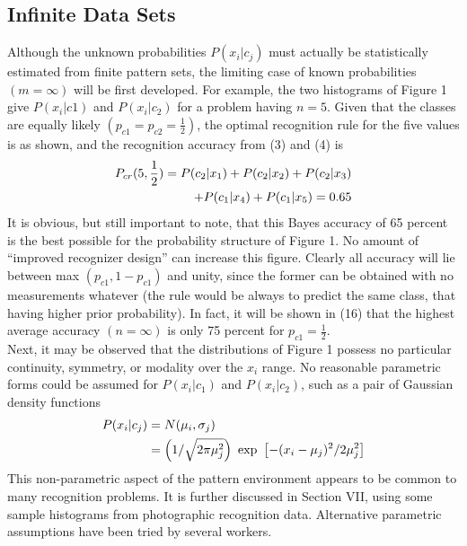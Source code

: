 \documentclass[10pt, a4paper]{article}
\begin{document}
\begin{CJK*}{UTF8}{bsmi}
\begin{multicols}{2}
\section{Infinite Data Sets}
\hspace{1em} Although the unknown probabilities $P(x_i | c_j)$ must actually be statistically estimated from finite pattern sets, the limiting case of known probabilities $(m = \infty)$ will be first developed. 
For example, the two histograms of Figure 1 give $P(x_i | c1)$ and $P(x_i | c_2)$ for a problem having $n = 5$. 
Given that the classes are equally likely $(p_{c1} = p_{c2} = \frac{1}{2})$, the optimal recognition rule for the five values is as shown, and the recognition accuracy from (3) and (4) is
\begin{align}
    P_{cr}(5, \frac{1}{2})=P(c_2|x_1)+P(c_2|x_2)+P(c_2|x_3) \notag \\
    +P(c_1|x_4)+P(c_1|x_5)=0.65
\end{align}
\hspace{1em} It is obvious, but still important to note, that this Bayes accuracy of 65 percent is the best possible for the probability structure of Figure 1. 
No amount of “improved recognizer design” can increase this figure. 
Clearly all accuracy will lie between max $(p_{c1}, 1 -p_{c1})$ and unity, since the former can be obtained with no measurements whatever (the rule would be always to predict the same class, that having higher prior probability). 
In fact, it will be shown in (16) that the highest average accuracy $(n = \infty)$ is only 75 percent for $p_{c1} = \frac{1}{2}$. \\
\hspace{1em} Next, it may be observed that the distributions of Figure 1 possess no particular continuity, symmetry, or modality over the $x_i$ range. 
No reasonable parametric forms could be assumed for $P(x_i|c_1)$ and $P(x_i|c_2)$, such as a pair of Gaussian density functions
\begin{align}
    P(x_i|c_j) &= N(\mu_i, \sigma_j) \notag \\
    &= \left(1/\sqrt{2\pi\mu^2_j}\right)\ \exp\ \left[-(x_i-\mu_j)^2/2\mu^2_j\right] \notag
\end{align}
\hspace{1em} This non-parametric aspect of the pattern environment appears to be common to many recognition problems. 
It is further discussed in Section VII, using some sample histograms from photographic recognition data.
\hspace{1em} Alternative parametric assumptions have been tried by several workers. 

\end{multicols}
\end{CJK*}
\end{document}
